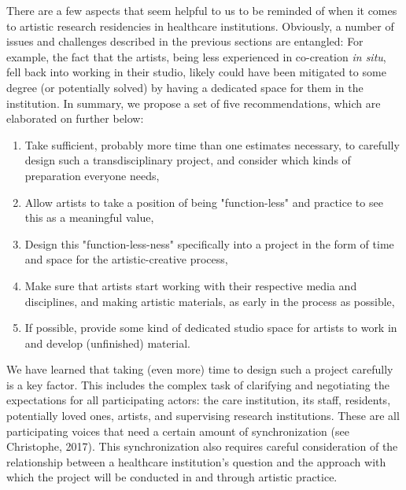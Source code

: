 \documentclass[authordate, empirical]{jote-new-article}
\begin{document}
	{

	There are a few aspects that seem helpful to us to be reminded of when it comes to artistic research residencies in healthcare institutions. Obviously, a number of issues and challenges described in the previous sections are entangled: For example, the fact that the artists, being less experienced in co-creation \emph{in situ}, fell back into working in their studio, likely could have been mitigated to some degree (or potentially solved) by having a dedicated space for them in the institution. In summary, we propose a set of five recommendations, which are elaborated on further below:





	\begin{enumerate}


		\item Take sufficient, probably more time than one estimates necessary, to carefully design such a transdisciplinary project, and consider which kinds of preparation everyone needs,



		\item
		Allow artists to take a position of being "function-less" and practice to see this as a meaningful value,



		\item Design this "function-less-ness" specifically into a project in the form of time and space for the artistic-creative process,



		\item
		Make sure that artists start working with their respective media and disciplines, and making artistic materials, as early in the process as possible,



		\item If possible, provide some kind of dedicated studio space for artists to work in and develop (unfinished) material.


	\end{enumerate}





	We have learned that taking (even more) time to design such a project carefully is a key factor. This includes the complex task of clarifying and negotiating the expectations for all participating actors: the care institution, its staff, residents, potentially loved ones, artists, and supervising research institutions. These are all participating voices that need a certain amount of synchronization (see Christophe, 2017). This synchronization also requires careful consideration of the relationship between a healthcare institution's question and the approach with which the project will be conducted in and through artistic practice.







}
\end{document}
